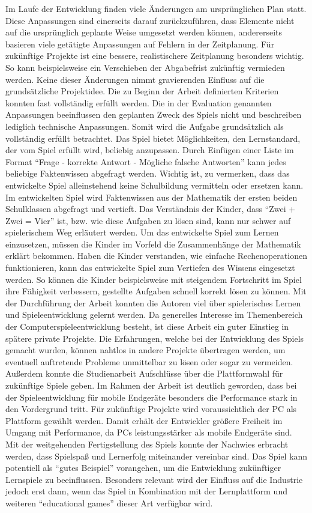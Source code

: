 Im Laufe der Entwicklung finden viele Änderungen am ursprünglichen Plan statt. Diese Anpassungen sind einerseits darauf zurückzuführen, dass Elemente nicht auf die ursprünglich geplante Weise umgesetzt werden können, andererseits basieren viele getätigte Anpassungen auf Fehlern in der Zeitplanung. Für zukünftige Projekte ist eine bessere, realistischere Zeitplanung besonders wichtig. So kann beispielsweise ein Verschieben der Abgabefrist zukünftig vermieden werden.
Keine dieser Änderungen nimmt gravierenden Einfluss auf die grundsätzliche Projektidee. Die zu Beginn der Arbeit definierten Kriterien konnten fast vollständig erfüllt werden. Die in der Evaluation genannten Anpassungen beeinflussen den geplanten Zweck des Spiels nicht und beschreiben lediglich technische Anpassungen. Somit wird die Aufgabe grundsätzlich als vollständig erfüllt betrachtet.
Das Spiel bietet Möglichkeiten, den Lernstandard, der vom Spiel erfüllt wird, beliebig anzupassen. Durch Einfügen einer Liste im Format \enquote{Frage - korrekte Antwort - Mögliche falsche Antworten} kann jedes beliebige Faktenwissen abgefragt werden.
Wichtig ist, zu vermerken, dass das entwickelte Spiel alleinstehend keine Schulbildung vermitteln oder ersetzen kann. Im entwickelten Spiel wird Faktenwissen aus der Mathematik der ersten beiden Schulklassen abgefragt und vertieft. Das Verständnis der Kinder, dass \enquote{Zwei + Zwei = Vier} ist, bzw. wie diese Aufgaben zu lösen sind, kann nur schwer auf spielerischem Weg erläutert werden. Um das entwickelte Spiel zum Lernen einzusetzen, müssen die Kinder im Vorfeld die Zusammenhänge der Mathematik erklärt bekommen. Haben die Kinder verstanden, wie einfache Rechenoperationen funktionieren, kann das entwickelte Spiel zum Vertiefen des Wissens eingesetzt werden. So können die Kinder beispielsweise mit steigendem Fortschritt im Spiel ihre Fähigkeit verbessern, gestellte Aufgaben schnell korrekt lösen zu können.
Mit der Durchführung der Arbeit konnten die Autoren viel über spielerisches Lernen und Spieleentwicklung gelernt werden. Da generelles Interesse im Themenbereich der Computerspieleentwicklung besteht, ist diese Arbeit ein guter Einstieg in spätere private Projekte. Die Erfahrungen, welche bei der Entwicklung des Spiels gemacht wurden, können nahtlos in andere Projekte übertragen werden, um eventuell auftretende Probleme unmittelbar zu lösen oder sogar zu vermeiden. Außerdem konnte die Studienarbeit Aufschlüsse über die Plattformwahl für zukünftige Spiele geben. Im Rahmen der Arbeit ist deutlich geworden, dass bei der Spieleentwicklung für mobile Endgeräte besonders die Performance stark in den Vordergrund tritt. Für zukünftige Projekte wird voraussichtlich der PC als Plattform gewählt werden. Damit erhält der Entwickler größere Freiheit im Umgang mit Performance, da PCs leistungsstärker als mobile Endgeräte sind.
Mit der weitgehenden Fertigstellung des Spiels konnte der Nachwies erbracht werden, dass Spielspaß und Lernerfolg miteinander vereinbar sind. Das Spiel kann potentiell als \enquote{gutes Beispiel} vorangehen, um die Entwicklung zukünftiger Lernspiele zu beeinflussen. Besonders relevant wird der Einfluss auf die Industrie jedoch erst dann, wenn das Spiel in Kombination mit der Lernplattform und weiteren \enquote{educational games} dieser Art verfügbar wird.


